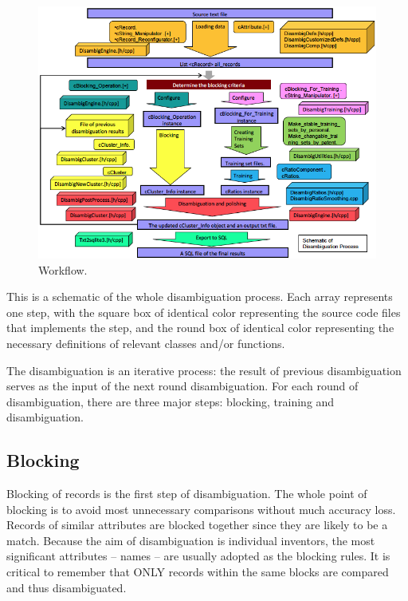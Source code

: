 \documentclass{article}
\begin{document}
\begin{figure}
\begin{center}
\includegraphics[width=6in]{images/disambiguation_workflow.png}
\caption{Workflow.}
\label{fig:workflow}
\end{center}
\end{figure}



This is a schematic of the whole disambiguation process. 
Each array represents one step, with the
square box of identical color representing the source 
code files that implements the step, and the round
box of identical color representing the necessary 
definitions of relevant classes and/or functions.


The disambiguation is an iterative process: 
the result of previous disambiguation serves as the input of
the next round disambiguation. For each round of disambiguation, 
there are three major steps: blocking, training and disambiguation.

\subsection{Blocking}

Blocking of records is the first step of disambiguation. 
The whole point of blocking is to avoid most
unnecessary comparisons without much accuracy loss. Records 
of similar attributes are blocked
together since they are likely to be a match. Because the 
aim of disambiguation is individual inventors,
the most significant attributes – names – are 
usually adopted as the blocking rules. It is critical to
remember that ONLY records within the same blocks are 
compared and thus disambiguated.
\end{document}
